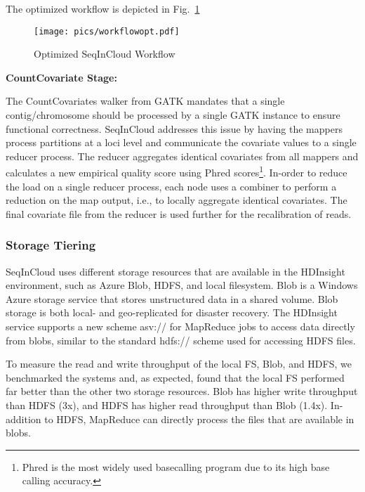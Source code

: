 The optimized workflow is depicted in Fig.~\ref{fig:workflowopt}

\begin{figure}[!tpb]
  \centering
  \texttt{[image: pics/workflowopt.pdf]}
  \caption{Optimized SeqInCloud Workflow}
  \label{fig:workflowopt}
\end{figure}

\textbf{CountCovariate Stage: }

The CountCovariates walker from GATK mandates that a single contig/chromosome should be processed by a single GATK instance to ensure functional correctness. SeqInCloud addresses this issue by having the mappers process partitions at a loci level and communicate the covariate values to a single reducer process. The reducer aggregates identical covariates from all mappers and calculates a new empirical quality score using Phred scores\footnote {Phred is the most widely used basecalling program due to its high base calling accuracy.}. In-order to reduce the load on a single reducer process, each node uses a combiner to perform a reduction on the map output, i.e., to locally aggregate identical covariates. The final covariate file from the reducer is used further for the recalibration of reads.

\subsubsection{Storage Tiering}

SeqInCloud uses different storage resources that are available in the HDInsight environment, such as Azure Blob, HDFS, and local filesystem. Blob is a Windows Azure storage service that stores unstructured data in a shared volume. Blob storage is both local- and geo-replicated for disaster recovery. The HDInsight service supports a new scheme asv:// for MapReduce jobs to access data directly from blobs, similar to the standard hdfs:// scheme used for accessing HDFS files. 

To measure the read and write throughput of the local FS, Blob, and HDFS, we benchmarked the systems and, as expected, found that the local FS performed far better than the other two storage resources. Blob has higher write throughput than HDFS (3x), and HDFS has higher read throughput than Blob (1.4x). In-addition to HDFS, MapReduce can directly process the files that are available in blobs.


